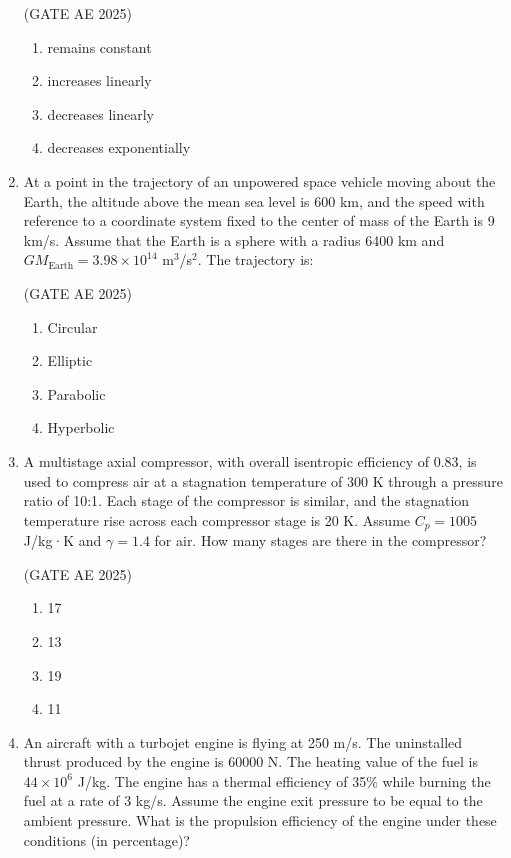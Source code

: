 \documentclass[journal,12pt,onecolumn]{IEEEtran}
\theoremstyle{remark}
\begin{document}
\begin{flushleft}
\begin{enumerate}
\hfill (GATE AE 2025)

\begin{enumerate}
 \item remains constant
 \item increases linearly
 \item decreases linearly
 \item decreases exponentially
\end{enumerate}

\item At a point in the trajectory of an unpowered space vehicle moving about the Earth, the altitude above the mean sea level is 600 km, and the speed with reference to a coordinate system fixed to the center of mass of the Earth is 9 km/s. Assume that the Earth is a sphere with a radius 6400 km and $GM_{\text{Earth}} = 3.98 \times 10^{14}$ m$^3$/s$^2$. The trajectory is:

\hfill (GATE AE 2025)

\begin{enumerate}
\item Circular
\item Elliptic
\item Parabolic
\item Hyperbolic
\end{enumerate}
  

\item  A multistage axial compressor, with overall isentropic efficiency of 0.83, is used to compress air at a stagnation temperature of 300 K through a pressure ratio of 10:1. Each stage of the compressor is similar, and the stagnation temperature rise across each compressor stage is 20 K. Assume $C_p = 1005$ J/kg·K and $\gamma = 1.4$ for air. How many stages are there in the compressor?

\hfill (GATE AE 2025)

\begin{enumerate}
    \item 17
    \item 13
    \item 19
    \item 11
\end{enumerate}

\item An aircraft with a turbojet engine is flying at 250 m/s. The uninstalled thrust produced by the engine is 60000 N. The heating value of the fuel is $44 \times 10^6$ J/kg. The engine has a thermal efficiency of 35\% while burning the fuel at a rate of 3 kg/s. Assume the engine exit pressure to be equal to the ambient pressure. What is the propulsion efficiency of the engine under these conditions (in percentage)?


\end{enumerate}
\end{flushleft}
\end{document}
